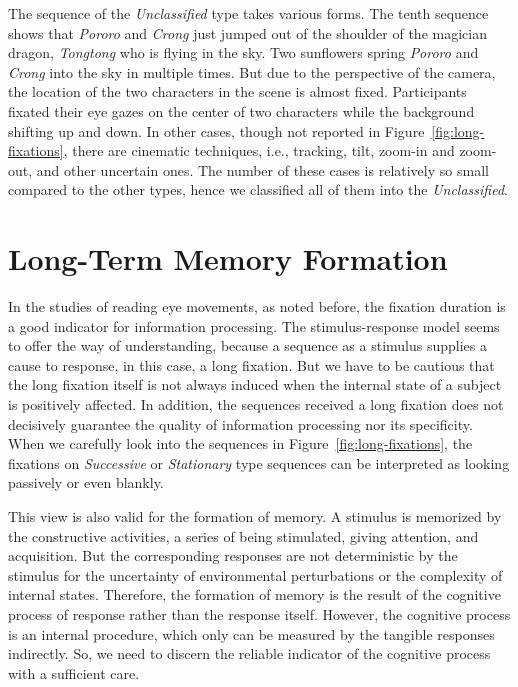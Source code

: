 \documentclass[oneside,master]{snueethesis}
\begin{document}
The sequence of the \textit{Unclassified} type takes various forms. The tenth sequence shows that \textit{Pororo} and \textit{Crong} just jumped out of the shoulder of the magician dragon, \textit{Tongtong} who is flying in the sky. Two sunflowers spring \textit{Pororo} and \textit{Crong} into the sky in multiple times. But due to the perspective of the camera, the location of the two characters in the scene is almost fixed. Participants fixated their eye gazes on the center of two characters while the background shifting up and down. In other cases, though not reported in Figure~\ref{fig:long-fixations}, there are cinematic techniques, i.e., tracking, tilt, zoom-in and zoom-out, and other uncertain ones. The number of these cases is relatively so small compared to the other types, hence we classified all of them into the \textit{Unclassified}.



\chapter{Long-Term Memory Formation}

In the studies of reading eye movements, as noted before, the fixation duration is a good indicator for information processing. The stimulus-response model seems to offer the way of understanding, because a sequence as a stimulus supplies a cause to response, in this case, a long fixation. But we have to be cautious that the long fixation itself is not always induced when the internal state of a subject is positively affected. In addition, the sequences received a long fixation does not decisively guarantee the quality of information processing nor its specificity. When we carefully look into the sequences in Figure~\ref{fig:long-fixations}, the fixations on \textit{Successive} or \textit{Stationary} type sequences can be interpreted as looking passively or even blankly.

This view is also valid for the formation of memory. A stimulus is memorized by the constructive activities, a series of being stimulated, giving attention, and acquisition. But the corresponding responses are not deterministic by the stimulus for the uncertainty of environmental perturbations or the complexity of internal states. Therefore, the formation of memory is the result of the cognitive process of response rather than the response itself. However, the cognitive process is an internal procedure, which only can be measured by the tangible responses indirectly. So, we need to discern the reliable indicator of the cognitive process with a sufficient care.
\end{document}
